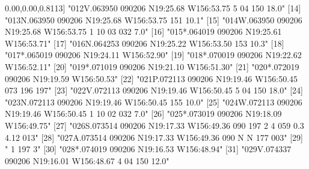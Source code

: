 \documentclass[
]{book}
\newenvironment{Shaded}{\begin{snugshade}}{\end{snugshade}}
\newcommand{\DecValTok}[1]{\textcolor[rgb]{0.00,0.00,0.81}{#1}}
\newcommand{\NormalTok}[1]{#1}
\newcommand{\StringTok}[1]{\textcolor[rgb]{0.31,0.60,0.02}{#1}}
\begin{document}
\begin{Shaded}
\begin{Highlighting}[]
\NormalTok{[}\DecValTok{13}\NormalTok{] }\StringTok{"012V.063950 090206 N19:25.68 W156:53.75    5   04  150      18.0"}                      
\NormalTok{[}\DecValTok{14}\NormalTok{] }\StringTok{"013N.063950 090206 N19:25.68 W156:53.75  151 10.1"}                                     
\NormalTok{[}\DecValTok{15}\NormalTok{] }\StringTok{"014W.063950 090206 N19:25.68 W156:53.75    1   10   03  032  7.0"}                      
\NormalTok{[}\DecValTok{16}\NormalTok{] }\StringTok{"015*.064019 090206 N19:25.61 W156:53.71"}                                               
\NormalTok{[}\DecValTok{17}\NormalTok{] }\StringTok{"016N.064253 090206 N19:25.22 W156:53.50  153 10.3"}                                     
\NormalTok{[}\DecValTok{18}\NormalTok{] }\StringTok{"017*.065019 090206 N19:24.11 W156:52.90"}                                               
\NormalTok{[}\DecValTok{19}\NormalTok{] }\StringTok{"018*.070019 090206 N19:22.62 W156:52.11"}                                               
\NormalTok{[}\DecValTok{20}\NormalTok{] }\StringTok{"019*.071019 090206 N19:21.10 W156:51.30"}                                               
\NormalTok{[}\DecValTok{21}\NormalTok{] }\StringTok{"020*.072019 090206 N19:19.59 W156:50.53"}                                               
\NormalTok{[}\DecValTok{22}\NormalTok{] }\StringTok{"021P.072113 090206 N19:19.46 W156:50.45  073  196  197"}                                
\NormalTok{[}\DecValTok{23}\NormalTok{] }\StringTok{"022V.072113 090206 N19:19.46 W156:50.45    5   04  150      18.0"}                      
\NormalTok{[}\DecValTok{24}\NormalTok{] }\StringTok{"023N.072113 090206 N19:19.46 W156:50.45  155 10.0"}                                     
\NormalTok{[}\DecValTok{25}\NormalTok{] }\StringTok{"024W.072113 090206 N19:19.46 W156:50.45    1   10   02  032  7.0"}                      
\NormalTok{[}\DecValTok{26}\NormalTok{] }\StringTok{"025*.073019 090206 N19:18.09 W156:49.75"}                                               
\NormalTok{[}\DecValTok{27}\NormalTok{] }\StringTok{"026S.073514 090206 N19:17.33 W156:49.36  090  197    2    4  059  0.3 4.12  013"}       
\NormalTok{[}\DecValTok{28}\NormalTok{] }\StringTok{"027A.073514 090206 N19:17.33 W156:49.36  090         N    N  177  003"}                 
\NormalTok{[}\DecValTok{29}\NormalTok{] }\StringTok{"   1                                     197              3"}                           
\NormalTok{[}\DecValTok{30}\NormalTok{] }\StringTok{"028*.074019 090206 N19:16.53 W156:48.94"}                                               
\NormalTok{[}\DecValTok{31}\NormalTok{] }\StringTok{"029V.074337 090206 N19:16.01 W156:48.67    4   04  150      12.0"}                      
\end{Highlighting}
\end{Shaded}
\end{document}
